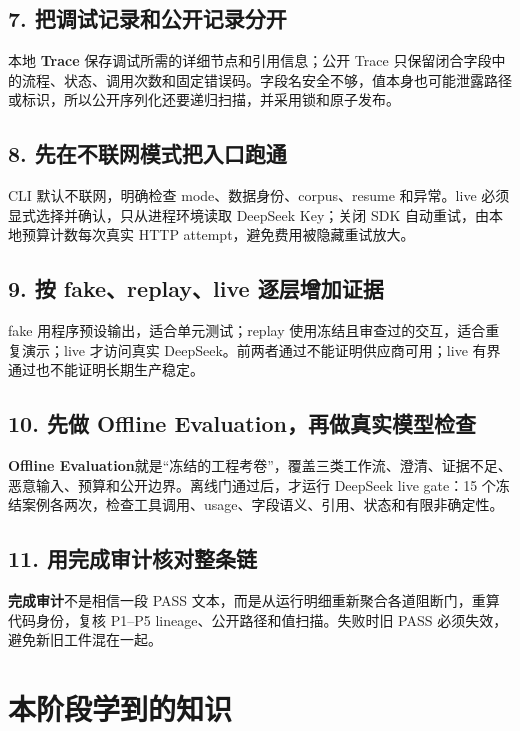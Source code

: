 \subsection{7. 把调试记录和公开记录分开}

本地 \textbf{Trace} 保存调试所需的详细节点和引用信息；公开 Trace 只保留闭合字段中的流程、状态、调用次数和固定错误码。字段名安全不够，值本身也可能泄露路径或标识，所以公开序列化还要递归扫描，并采用锁和原子发布。

\subsection{8. 先在不联网模式把入口跑通}

CLI 默认不联网，明确检查 mode、数据身份、corpus、resume 和异常。live 必须显式选择并确认，只从进程环境读取 DeepSeek Key；关闭 SDK 自动重试，由本地预算计数每次真实 HTTP attempt，避免费用被隐藏重试放大。

\subsection{9. 按 fake、replay、live 逐层增加证据}

fake 用程序预设输出，适合单元测试；replay 使用冻结且审查过的交互，适合重复演示；live 才访问真实 DeepSeek。前两者通过不能证明供应商可用；live 有界通过也不能证明长期生产稳定。

\subsection{10. 先做 Offline Evaluation，再做真实模型检查}

\textbf{Offline Evaluation}就是“冻结的工程考卷”，覆盖三类工作流、澄清、证据不足、恶意输入、预算和公开边界。离线门通过后，才运行 DeepSeek live gate：15 个冻结案例各两次，检查工具调用、usage、字段语义、引用、状态和有限非确定性。

\subsection{11. 用完成审计核对整条链}

\textbf{完成审计}不是相信一段 PASS 文本，而是从运行明细重新聚合各道阻断门，重算代码身份，复核 P1--P5 lineage、公开路径和值扫描。失败时旧 PASS 必须失效，避免新旧工件混在一起。

\section{本阶段学到的知识}

